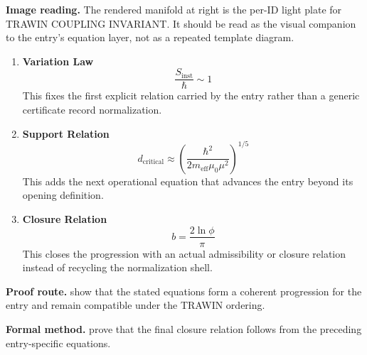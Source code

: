 \begin{samepage}
\noindent\begin{minipage}[t]{0.45\linewidth}
\vspace{0pt}
\raggedright
\scriptsize\textbf{Image reading.} The rendered manifold at right is the per-ID light plate for TRAWIN COUPLING INVARIANT. It should be read as the visual companion to the entry's equation layer, not as a repeated template diagram.\par
\end{minipage}\hfill
\begin{minipage}[t]{0.53\linewidth}
\vspace*{-0.10in}
\raggedright
{}
\end{minipage}
\end{samepage}

\clearpage


\begin{enumerate}[leftmargin=1.6em,itemsep=9pt,topsep=6pt]
\item \textbf{Variation Law}
\[
\frac{S_{\mathrm{inst}}}{\hbar}\sim 1
\]
This fixes the first explicit relation carried by the entry rather than a generic certificate record normalization.

\item \textbf{Support Relation}
\[
d_{\mathrm{critical}}\approx
\left(\frac{\hbar^2}{2m_{\mathrm{eff}}\mu_0\mu^2}\right)^{1/5}
\]
This adds the next operational equation that advances the entry beyond its opening definition.

\item \textbf{Closure Relation}
\[
b=\frac{2\ln\phi}{\pi}
\]
This closes the progression with an actual admissibility or closure relation instead of recycling the normalization shell.
\end{enumerate}

\textbf{Proof route.} show that the stated equations form a coherent progression for the entry and remain compatible under the TRAWIN ordering.

\textbf{Formal method.} prove that the final closure relation follows from the preceding entry-specific equations.

\medskip
{}

